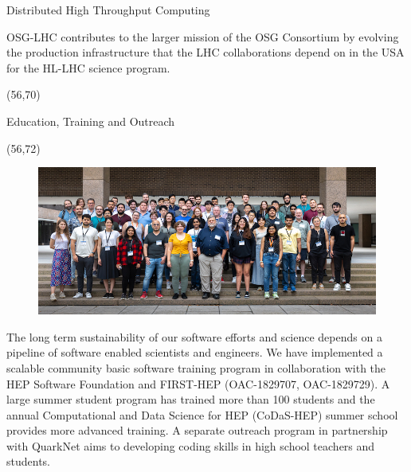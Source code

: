 \documentclass[final]{beamer}
\begin{document}
\begin{frame}{}
\begin{textblock}{25.0}
\begin{block}{Distributed High Throughput Computing}
\begin{textblock}{25.0}
\begin{figure}[tbph]
\end{figure}
OSG-LHC contributes to the larger mission of the OSG Consortium by evolving the production infrastructure that the LHC collaborations depend on in the USA for the HL-LHC science program. 
\end{textblock}
\end{block}
\end{textblock}
\begin{textblock}{25.0}(56,70)
\begin{block}{Education, Training and Outreach}
\begin{textblock}{25.0}(56,72)
\begin{figure}[tbph]
\centering
\includegraphics[width=1.00\textwidth]{images/codas-hep-2023-group-photo-thumbnail.jpg}
\end{figure}
The long term sustainability of our software efforts and science depends on a pipeline of software enabled scientists and engineers. We have implemented a scalable community basic software training program in collaboration with the HEP Software Foundation and FIRST-HEP (OAC-1829707, OAC-1829729). A large summer student program has trained more than 100 students and the annual Computational and Data Science for HEP (CoDaS-HEP) summer school provides more advanced training. A separate outreach program in partnership with QuarkNet aims to developing coding skills in high school teachers and students.
\end{textblock}
\end{block}
\end{textblock}



\end{frame}
\end{document}
